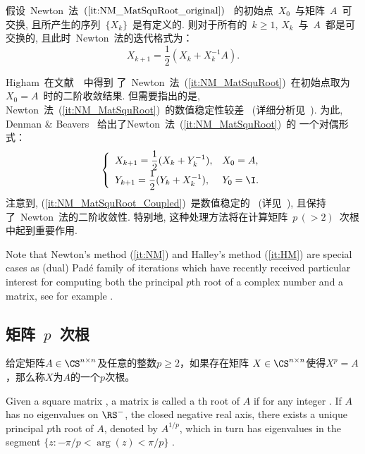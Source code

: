 \begin{lemma}
假设~Newton~法~$(\ref{it:NM_MatSquRoot_original})$~
的初始点~$X_0$~与矩阵~$A$~可交换,
且所产生的序列~$\{X_k\}$~是有定义的. 则对于所有的~$k\geq1$,
$X_k$~与~$A$~都是可交换的, 且此时~Newton~法的迭代格式为：
\begin{equation}
\label{it:NM_MatSquRoot} X_{k+1} = \frac{1}{2}(X_k+X_k^{-1}A).
\end{equation}
\end{lemma}

Higham~在文献~\cite{Higham1986}~中得到
了~Newton~法~(\ref{it:NM_MatSquRoot})~在初始点取为~$X_0 =
A$~时的二阶收敛结果. 但需要指出的是,
Newton~法~(\ref{it:NM_MatSquRoot})~的数值稳定性较差
~(详细分析见~\cite[6.4~节]{Higham2008}). 为此, Denman $\&$ Beavers
\cite{Denman1976}~给出了Newton~法~(\ref{it:NM_MatSquRoot})~的
一个对偶形式：
\begin{equation}
\label{it:NM_MatSquRoot_Coupled} \left\{
\begin{array}{ll}
\displaystyle X_{k + 1} = \frac{1}{2}(X_k + Y_k^{-1}), & X_0 =
A, \\
\displaystyle Y_{k + 1} = \frac{1}{2}(Y_k + X_k^{-1}), & Y_0 = \I.
\end{array} \right.
\end{equation}
注意到, (\ref{it:NM_MatSquRoot_Coupled})~是数值稳定的
~(详见~\cite[6.4~节]{Higham2008}), 且保持了~Newton~法的二阶收敛性.
特别地, 这种处理方法将在计算矩阵~$p\, (> 2)$~次根中起到重要作用.




Note that Newton's method (\ref{it:NM}) and Halley's method
(\ref{it:HM}) are special cases as (dual) Pad\'{e} family of
iterations which have recently received particular interest for
computing both the principal $p$th root of a complex number and a
matrix, see for example
\cite{Gomilko2012,Laszkiewicz2009,Zietak2013,Iannazzo2008}.



\subsection{矩阵~$p$~次根}

给定矩阵$A \in \CS^{n\times n}$及任意的整数$p \geq 2$，如果存在矩阵
$X \in \CS^{n \times n}$使得$X^p = A$，那么称$X$为$A$的一个$p$次根。


Given a square matrix , a matrix is called a th root of $A$ if
 for any integer . If $A$ has no eigenvalues on $\RS^-$,
the closed negative real axis, there exists a unique principal $p$th
root of $A$, denoted by $A^{1/p}$, which in turn has eigenvalues in
the segment $\{z: -\pi/p < \arg(z) < \pi/p\}$ \cite[Theorem
7.2]{Higham2008}.


